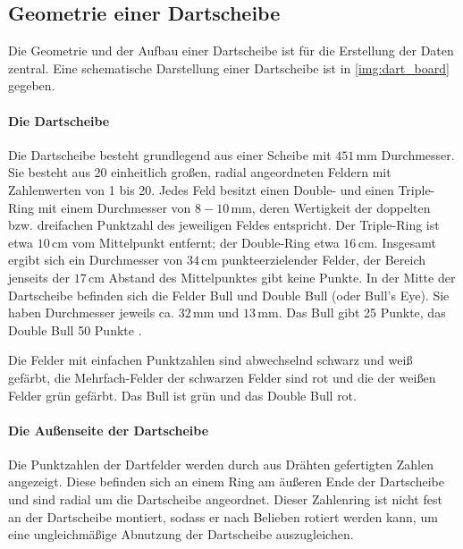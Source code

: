 
\subsection{Geometrie einer Dartscheibe}  %
\label{sec:dartscheiben_geometrie}

Die Geometrie und der Aufbau einer Dartscheibe ist für die Erstellung der Daten zentral. Eine schematische Darstellung einer Dartscheibe ist in \autoref{img:dart_board} gegeben.

\paragraph{Die Dartscheibe}

Die Dartscheibe besteht grundlegend aus einer Scheibe mit $451\,\text{mm}$ Durchmesser. Sie besteht aus 20 einheitlich großen, radial angeordneten Feldern mit Zahlenwerten von 1 bis 20. Jedes Feld besitzt einen Double- und einen Triple-Ring mit einem Durchmesser von $8-10\,\text{mm}$, deren Wertigkeit der doppelten bzw. dreifachen Punktzahl des jeweiligen Feldes entspricht. Der Triple-Ring ist etwa $10\,\text{cm}$ vom Mittelpunkt entfernt; der Double-Ring etwa $16\,\text{cm}$. Insgesamt ergibt sich ein Durchmesser von $34\,\text{cm}$ punkteerzielender Felder, der Bereich jenseits der $17\,\text{cm}$ Abstand des Mittelpunktes gibt keine Punkte. In der Mitte der Dartscheibe befinden sich die Felder Bull und Double Bull (oder Bull's Eye). Sie haben Durchmesser jeweils ca. $32\,\text{mm}$ und $13\,\text{mm}$. Das Bull gibt 25 Punkte, das Double Bull 50 Punkte \cite{wdf-rules}.

Die Felder mit einfachen Punktzahlen sind abwechselnd schwarz und weiß gefärbt, die Mehrfach-Felder der schwarzen Felder sind rot und die der weißen Felder grün gefärbt. Das Bull ist grün und das Double Bull rot.

\paragraph{Die Außenseite der Dartscheibe}

Die Punktzahlen der Dartfelder werden durch aus Drähten gefertigten Zahlen angezeigt. Diese befinden sich an einem Ring am äußeren Ende der Dartscheibe und sind radial um die Dartscheibe angeordnet. Dieser Zahlenring ist nicht fest an der Dartscheibe montiert, sodass er nach Belieben rotiert werden kann, um eine ungleichmäßige Abnutzung der Dartscheibe auszugleichen.

